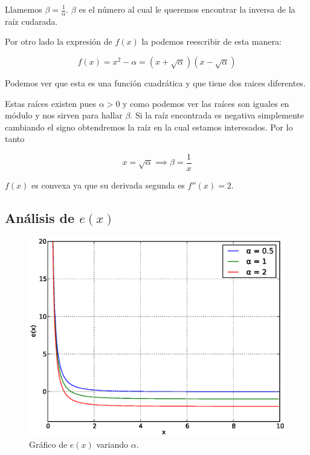 Llamemos $\displaystyle \beta = \frac{ 1 }{ \alpha }$. $\beta$ es el número al
cual le queremos encontrar la inversa de la raíz cudarada.

Por otro lado la expresión de $f(x)$ la podemos reescribir de esta manera:

\[
    f(x) = x^2 - \alpha = (x + \sqrt{\alpha})(x - \sqrt{\alpha})
\]

Podemos ver que esta es una función cuadrática y que tiene dos raices diferentes.

Estas raíces existen pues $\alpha > 0$ y como podemos ver las raíces son
iguales en módulo y nos sirven para hallar $\beta$. Si la raíz encontrada es
negativa simplemente cambiando el signo obtendremos la raíz en la cual estamos
interesados. Por lo tanto

\[
    x = \sqrt{\alpha} \implies \beta = \frac{ 1 }{ x }
\]

$f(x)$ es convexa ya que su derivada segunda es $f''(x) = 2$.

\subsection{Análisis de $e(x)$}\label{sec:analisis_e_x}

\begin{figure}[h]
  \begin{center}
    \includegraphics[scale=0.5]{graficos/new/e_x.eps}
    \caption{\label{fig:e_x} Gráfico de $e(x)$ variando $\alpha$.}
  \end{center}
\end{figure}

